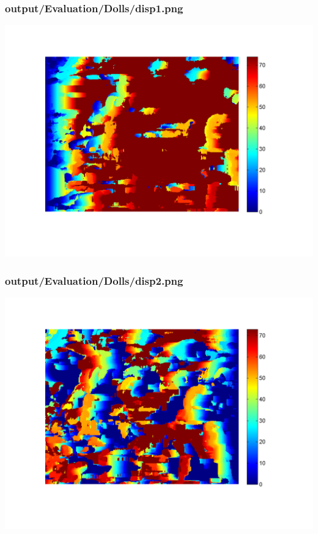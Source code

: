 \subsubsection{output/Evaluation/Dolls/disp1.png}
    \includegraphics[scale=0.5]{output/Evaluation/Dolls/disp1.png}

\subsubsection{output/Evaluation/Dolls/disp2.png}
    \includegraphics[scale=0.5]{output/Evaluation/Dolls/disp2.png}

